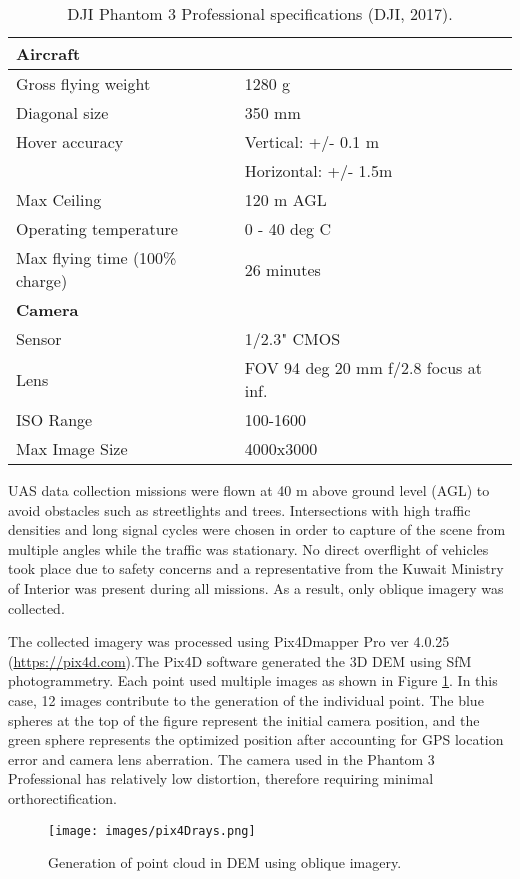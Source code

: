 \documentclass[preprint,12pt,a4paper]{elsarticle}
\begin{document}
\begin{linenumbers}
\begin{table}[H]
\centering
\caption{DJI Phantom 3 Professional specifications (DJI, 2017).}
\label{tb:p3p-specs}
\begin{tabular}{@{}ll@{}}
\hline
\textbf{Aircraft} &  \\ \hline
Gross flying weight & 1280 g \\
Diagonal size & 350 mm \\
Hover accuracy & Vertical: +/- 0.1 m \\
 & Horizontal: +/- 1.5m \\
Max Ceiling & 120 m AGL \\
Operating temperature & 0 - 40 deg C \\
Max flying time (100\% charge) & 26 minutes \\ \hline
\textbf{Camera} &  \\ \hline
Sensor & 1/2.3" CMOS \\
Lens & FOV 94 deg 20 mm f/2.8 focus at inf. \\
ISO Range & 100-1600 \\
Max Image Size & 4000x3000 \\ \hline
\end{tabular}
\end{table}

UAS data collection missions were flown at 40 m above ground level (AGL) to avoid obstacles such as streetlights and trees. Intersections with high traffic densities and long signal cycles were chosen in order to capture of the scene from multiple angles while the traffic was stationary. No direct overflight of vehicles took place due to safety concerns and a representative from the Kuwait Ministry of Interior was present during all missions. As a result, only oblique imagery was collected. 

The collected imagery was processed using Pix4Dmapper Pro ver 4.0.25 (\url{https://pix4d.com}).The Pix4D software generated the 3D DEM using SfM photogrammetry. Each point used multiple images as shown in Figure \ref{fig:pix4Drays}. In this case, 12 images contribute to the generation of the individual point. The blue spheres at the top of the figure represent the initial camera position, and the green sphere represents the optimized position after accounting for GPS location error and camera lens aberration. The camera used in the Phantom 3 Professional has relatively low distortion, therefore requiring minimal orthorectification.
%
\begin{figure}[H]
\centering
\texttt{[image: images/pix4Drays.png]} 
\caption{Generation of point cloud in DEM using oblique imagery.}
\label{fig:pix4Drays}
\end{figure}
%


\end{linenumbers}
\end{document}
